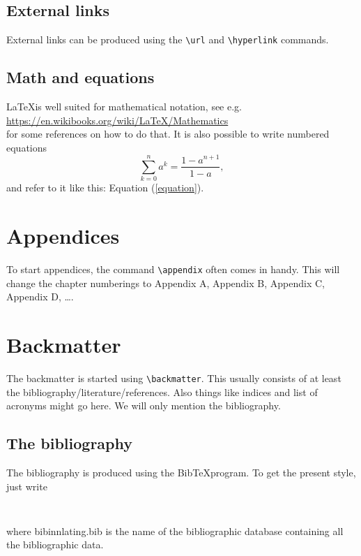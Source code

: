 \documentclass[a4paper,12pt,twoside,openright,titlepage]{book}
\begin{document}
\subsection{External links}
\label{external_links}
External links can be produced using the \texttt{\textbackslash url} and \texttt{\textbackslash hyperlink} commands. 

\subsection{Math and equations}

\LaTeX is well suited for mathematical notation, see e.g.\\ \url{https://en.wikibooks.org/wiki/LaTeX/Mathematics}\\
for some references on how to do that. 
It is also possible to write numbered equations
\begin{equation}
    \label{equation}
    \displaystyle\sum_{k=0}^{n} a^k = \frac{1 - a^{n+1}}{1 - a},
\end{equation}
and refer to it like this: Equation (\ref{equation}).

\section{Appendices}
To start appendices, the command \texttt{\textbackslash appendix} often comes in handy. This will change the chapter numberings to Appendix A, Appendix B, Appendix C, Appendix D, \ldots.

\section{Backmatter}
The backmatter is started using \texttt{\textbackslash backmatter}. This usually consists of at least the bibliography/literature/references. Also things like indices and list of acronyms might go here. We will only mention the bibliography. 

\subsection{The bibliography}
The bibliography is produced using the Bib\TeX program. To get the present style, just write 
\begin{verbatim}


\end{verbatim}
where bibinnlating.bib is the name of the bibliographic database containing all the bibliographic data. 
\end{document}
